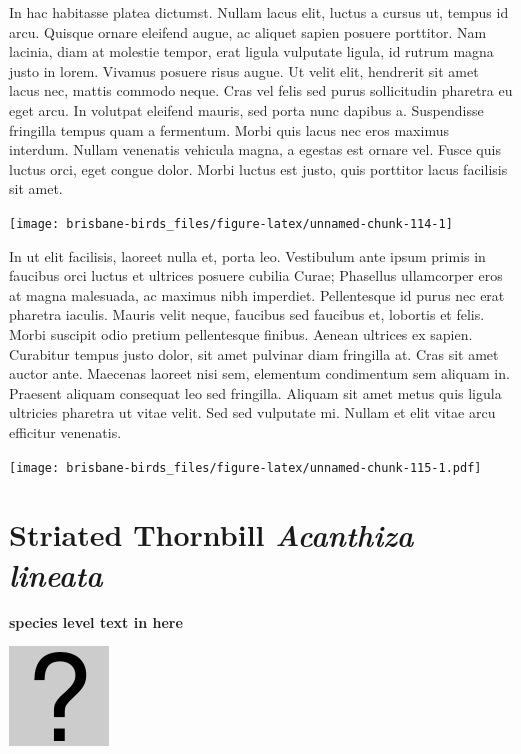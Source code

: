 \documentclass[]{book}
\let\origfigure\figure
\let\endorigfigure\endfigure
\renewenvironment{figure}[1][2] {
  \expandafter\origfigure\expandafter[H]
} {
  \endorigfigure
}
\begin{document}
In hac habitasse platea dictumst. Nullam lacus elit, luctus a cursus ut,
tempus id arcu. Quisque ornare eleifend augue, ac aliquet sapien posuere
porttitor. Nam lacinia, diam at molestie tempor, erat ligula vulputate
ligula, id rutrum magna justo in lorem. Vivamus posuere risus augue. Ut
velit elit, hendrerit sit amet lacus nec, mattis commodo neque. Cras vel
felis sed purus sollicitudin pharetra eu eget arcu. In volutpat eleifend
mauris, sed porta nunc dapibus a. Suspendisse fringilla tempus quam a
fermentum. Morbi quis lacus nec eros maximus interdum. Nullam venenatis
vehicula magna, a egestas est ornare vel. Fusce quis luctus orci, eget
congue dolor. Morbi luctus est justo, quis porttitor lacus facilisis sit
amet.

\begin{figure}
\texttt{[image: brisbane-birds\_files/figure-latex/unnamed-chunk-114-1]} \caption{insert figure caption}\label{fig:unnamed-chunk-114}
\end{figure}

In ut elit facilisis, laoreet nulla et, porta leo. Vestibulum ante ipsum
primis in faucibus orci luctus et ultrices posuere cubilia Curae;
Phasellus ullamcorper eros at magna malesuada, ac maximus nibh
imperdiet. Pellentesque id purus nec erat pharetra iaculis. Mauris velit
neque, faucibus sed faucibus et, lobortis et felis. Morbi suscipit odio
pretium pellentesque finibus. Aenean ultrices ex sapien. Curabitur
tempus justo dolor, sit amet pulvinar diam fringilla at. Cras sit amet
auctor ante. Maecenas laoreet nisi sem, elementum condimentum sem
aliquam in. Praesent aliquam consequat leo sed fringilla. Aliquam sit
amet metus quis ligula ultricies pharetra ut vitae velit. Sed sed
vulputate mi. Nullam et elit vitae arcu efficitur venenatis.

\begin{figure}
\centering
\texttt{[image: brisbane-birds\_files/figure-latex/unnamed-chunk-115-1.pdf]}
\caption{\label{fig:unnamed-chunk-115}insert figure caption}
\end{figure}

\section{\texorpdfstring{Striated Thornbill \emph{Acanthiza
lineata}}{Striated Thornbill Acanthiza lineata}}\label{striated-thornbill-acanthiza-lineata}

\textbf{species level text in here}

\begin{figure}
\centering
\includegraphics{assets/missing.png}
\caption{No image for species}
\end{figure}
\end{document}
